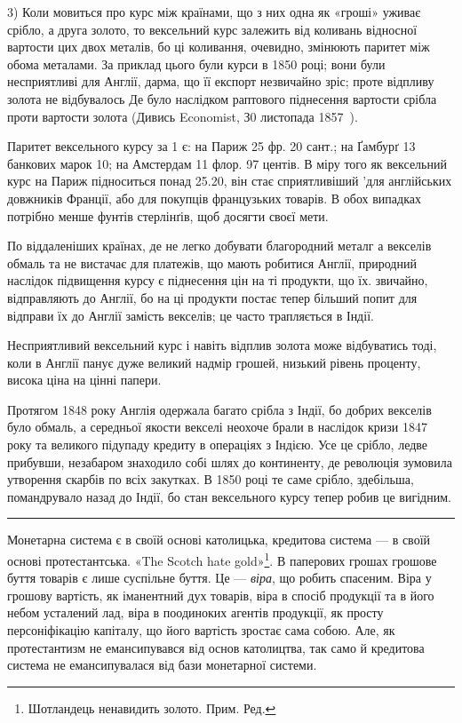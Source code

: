 
3) Коли мовиться про курс між країнами, що з них одна як «гроші»
уживає срібло, а друга золото, то вексельний курс залежить від коливань відносної
вартости цих двох металів, бо ці коливання, очевидно, змінюють паритет
між обома металами. За приклад цього були курси в 1850 році; вони були
несприятливі для Англії, дарма, що її експорт незвичайно зріс; проте відпливу
золота не відбувалось Де було наслідком раптового піднесення вартости срібла
проти вартости золота (Дивись Economist, З0 листопада 1857~).

Паритет вексельного курсу за 1 є: на Париж 25 фр. 20 сант.; на
Ґамбурґ 13 банкових марок 10; на Амстердам 11 флор. 97 центів.
В міру того як вексельний курс на Париж підноситься понад 25.20, він стає
сприятливіший 'для англійських довжників Франції, або для покупців французьких
товарів. В обох випадках потрібно менше фунтів стерлінґів, щоб досягти
своєї мети.

По віддаленіших країнах, де не легко добувати благородний металг
а векселів обмаль та не вистачає для платежів, що мають робитися Англії,
природний наслідок підвищення курсу є піднесення цін на ті продукти, що їх.
звичайно, відправляють до Англії, бо на ці продукти постає тепер більший попит
для відправи їх до Англії замість векселів; це часто трапляється в Індії.

Несприятливий вексельний курс і навіть відплив золота може відбуватись
тоді, коли в Англії панує дуже великий надмір грошей, низький рівень проценту,
висока ціна на цінні папери.

Протягом 1848 року Англія одержала багато срібла з Індії, бо добрих
векселів було обмаль, а середньої якости векселі неохоче брали в наслідок
кризи 1847 року та великого підупаду кредиту в операціях з Індією. Усе це
срібло, ледве прибувши, незабаром знаходило собі шлях до континенту, де революція
зумовила утворення скарбів по всіх закутках. В 1850 році те саме
срібло, здебільша, помандрувало назад до Індії, бо стан вексельного курсу тепер
робив це вигідним.

\pfbreak

Монетарна система є в своїй основі католицька, кредитова система — в своїй
основі протестантська. «The Scotch hate gold»\footnote*{
Шотландець ненавидить золото. Прим. Ред.
}. В паперових грошах грошове
буття товарів є лише суспільне буття. Це — \emph{віра}, що робить спасеним. Віра
у грошову вартість, як іманентний дух товарів, віра в спосіб продукції та в його
небом усталений лад, віра в поодиноких агентів продукції, як просту персоніфікацію
капіталу, що його вартість зростає сама собою. Але, як протестантизм
не емансипувався від основ католицтва, так само й кредитова система не емансипувалася
від бази монетарної системи.

